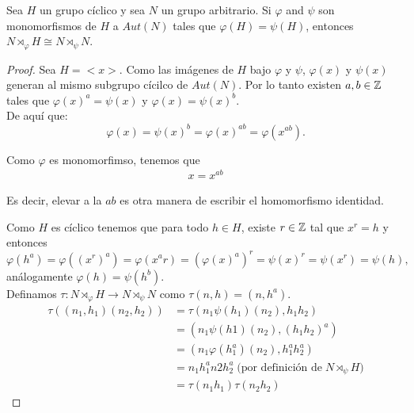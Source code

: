 Sea $H$ un grupo cíclico y sea $N$ un grupo arbitrario. Si $\varphi$ and $\psi$ son monomorfismos 
de $H$ a $Aut(N)$ tales que $\varphi(H) = \psi(H)$, entonces 
$N \rtimes_\varphi H \cong N \rtimes_\psi N$. \par\null

\begin{proof}
    Sea $H = <x>$. Como las imágenes de $H$ bajo $\varphi$ y $\psi$, $\varphi(x)$ y $\psi(x)$ generan
    al mismo subgrupo cícilco de $Aut(N)$. Por lo tanto existen $a,b \in \mathbb{Z}$ tales que 
    $\varphi(x)^a = \psi(x)$ y $\varphi(x) = \psi(x)^b$. \\ 
    
    De aquí que:
    \begin{equation} 
      \varphi(x) = \psi(x)^b = \varphi(x)^{ab} = \varphi(x^{ab}).
    \end{equation}

    Como $\varphi$ es monomorfimso, tenemos que 
    \begin{align} 
        x = x^{ab} \label{propocicion11:identidad}
    \end{align} 
    
    Es decir, elevar a la $ab$ es otra manera de escribir el homomorfismo identidad.		
    
    Como $H$ es cíclico tenemos que para todo $h \in H$, existe $r \in \mathbb{Z}$ tal que $x^r = h$ y entonces
    $$
    \varphi(h^a) = \varphi((x^r)^a) = 
    \varphi(x^ar) = (\varphi(x)^a)^r = 
    \psi(x)^r = \psi(x^r) = \psi(h),
    $$ 
    análogamente $\varphi(h) = \psi(h^b)$.  \\
    
    Definamos $\tau : N \rtimes_\varphi H \rightarrow N \rtimes_\psi N$ como $\tau(n,h)= (n, h^a)$.\\
    
    \begin{align}
    \tau((n_1, h_1)(n_2, h_2))	&=  \tau(n_1 \psi(h_1)(n_2), h_1h_2)\\
                                &= (n_1\psi(h1)(n_2), (h_1 h_2)^a) \\
                                &= (n_1\varphi(h_1^a)(n_2), h_1^a h_2^a)\\
                                &= n_1 h_1^a n2 h_2^a  \;\text{(por definición de} \; N \rtimes_\psi H \text{)}\\
                                &= \tau(n_1 h_1) \tau(n_2 h_2)
    \end{align}
                                    

\end{proof}
